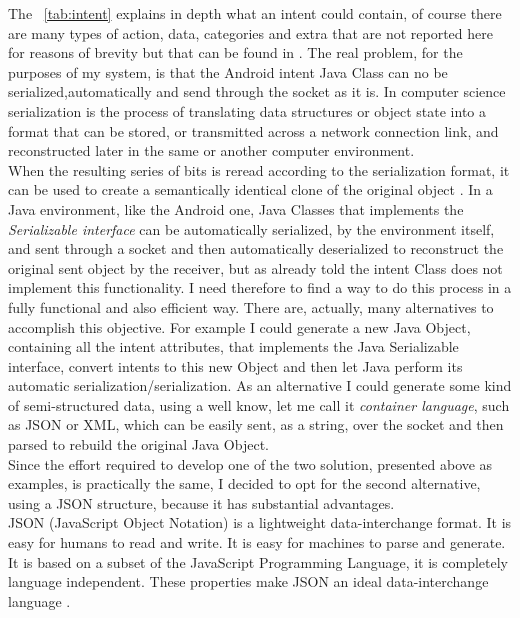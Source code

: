 The \tablename~\ref{tab:intent} explains in depth what an intent could contain, of course there are many types of action, data, categories and extra that are not reported here for reasons of brevity but that can be found in \cite{android2017intent}. The real problem, for the purposes of my system, is that the Android intent Java Class can no be serialized,automatically and send through the socket as it is. In computer science serialization is the process of translating data structures or object state into a format that can be stored, or transmitted across a network connection link, and reconstructed later in the same or another computer environment.\\ When the resulting series of bits is reread according to the serialization format, it can be used to create a semantically identical clone of the original object \cite{marshall2015c++}. In a Java environment, like the Android one, Java Classes that implements the \textit{Serializable interface} can be automatically serialized, by the environment itself, and sent through a socket  and then automatically deserialized to reconstruct the original sent object by the receiver, but as already told the intent Class does not implement this functionality. I need therefore to find a way to do this process in a fully functional and also efficient way. There are, actually, many alternatives to accomplish this objective. For example I could generate a new Java Object, containing all the intent attributes, that implements the Java Serializable interface, convert intents to this new Object and then let Java perform its automatic serialization/serialization. As an alternative I could generate some kind of semi-structured data, using a well know, let me call it \textit{container language}, such as JSON or XML, which can be easily sent, as a string, over the socket and then parsed to rebuild the original Java Object.\\
Since the effort required to develop one of the two solution, presented above as examples, is practically the same, I decided to opt for the second alternative, using a JSON structure, because it has substantial advantages.\\
JSON (JavaScript Object Notation) is a lightweight data-interchange format. It is easy for humans to read and write. It is easy for machines to parse and generate. It is based on a subset of the JavaScript Programming Language, it is completely language independent. These properties make JSON an ideal data-interchange
language \cite{w3c2007introducing}.\\
